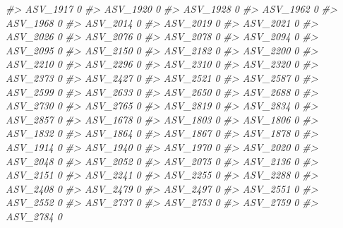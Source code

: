 \documentclass[
]{article}
\newenvironment{Shaded}{\begin{snugshade}}{\end{snugshade}}
\newcommand{\CommentTok}[1]{\textcolor[rgb]{0.56,0.35,0.01}{\textit{#1}}}
\begin{document}
\begin{Shaded}
\begin{Highlighting}[]
\CommentTok{\#\textgreater{} ASV\_1917  0}
\CommentTok{\#\textgreater{} ASV\_1920  0}
\CommentTok{\#\textgreater{} ASV\_1928  0}
\CommentTok{\#\textgreater{} ASV\_1962  0}
\CommentTok{\#\textgreater{} ASV\_1968  0}
\CommentTok{\#\textgreater{} ASV\_2014  0}
\CommentTok{\#\textgreater{} ASV\_2019  0}
\CommentTok{\#\textgreater{} ASV\_2021  0}
\CommentTok{\#\textgreater{} ASV\_2026  0}
\CommentTok{\#\textgreater{} ASV\_2076  0}
\CommentTok{\#\textgreater{} ASV\_2078  0}
\CommentTok{\#\textgreater{} ASV\_2094  0}
\CommentTok{\#\textgreater{} ASV\_2095  0}
\CommentTok{\#\textgreater{} ASV\_2150  0}
\CommentTok{\#\textgreater{} ASV\_2182  0}
\CommentTok{\#\textgreater{} ASV\_2200  0}
\CommentTok{\#\textgreater{} ASV\_2210  0}
\CommentTok{\#\textgreater{} ASV\_2296  0}
\CommentTok{\#\textgreater{} ASV\_2310  0}
\CommentTok{\#\textgreater{} ASV\_2320  0}
\CommentTok{\#\textgreater{} ASV\_2373  0}
\CommentTok{\#\textgreater{} ASV\_2427  0}
\CommentTok{\#\textgreater{} ASV\_2521  0}
\CommentTok{\#\textgreater{} ASV\_2587  0}
\CommentTok{\#\textgreater{} ASV\_2599  0}
\CommentTok{\#\textgreater{} ASV\_2633  0}
\CommentTok{\#\textgreater{} ASV\_2650  0}
\CommentTok{\#\textgreater{} ASV\_2688  0}
\CommentTok{\#\textgreater{} ASV\_2730  0}
\CommentTok{\#\textgreater{} ASV\_2765  0}
\CommentTok{\#\textgreater{} ASV\_2819  0}
\CommentTok{\#\textgreater{} ASV\_2834  0}
\CommentTok{\#\textgreater{} ASV\_2857  0}
\CommentTok{\#\textgreater{} ASV\_1678  0}
\CommentTok{\#\textgreater{} ASV\_1803  0}
\CommentTok{\#\textgreater{} ASV\_1806  0}
\CommentTok{\#\textgreater{} ASV\_1832  0}
\CommentTok{\#\textgreater{} ASV\_1864  0}
\CommentTok{\#\textgreater{} ASV\_1867  0}
\CommentTok{\#\textgreater{} ASV\_1878  0}
\CommentTok{\#\textgreater{} ASV\_1914  0}
\CommentTok{\#\textgreater{} ASV\_1940  0}
\CommentTok{\#\textgreater{} ASV\_1970  0}
\CommentTok{\#\textgreater{} ASV\_2020  0}
\CommentTok{\#\textgreater{} ASV\_2048  0}
\CommentTok{\#\textgreater{} ASV\_2052  0}
\CommentTok{\#\textgreater{} ASV\_2075  0}
\CommentTok{\#\textgreater{} ASV\_2136  0}
\CommentTok{\#\textgreater{} ASV\_2151  0}
\CommentTok{\#\textgreater{} ASV\_2241  0}
\CommentTok{\#\textgreater{} ASV\_2255  0}
\CommentTok{\#\textgreater{} ASV\_2288  0}
\CommentTok{\#\textgreater{} ASV\_2408  0}
\CommentTok{\#\textgreater{} ASV\_2479  0}
\CommentTok{\#\textgreater{} ASV\_2497  0}
\CommentTok{\#\textgreater{} ASV\_2551  0}
\CommentTok{\#\textgreater{} ASV\_2552  0}
\CommentTok{\#\textgreater{} ASV\_2737  0}
\CommentTok{\#\textgreater{} ASV\_2753  0}
\CommentTok{\#\textgreater{} ASV\_2759  0}
\CommentTok{\#\textgreater{} ASV\_2784  0}

\end{Highlighting}
\end{Shaded}
\end{document}
